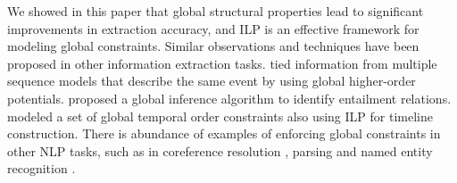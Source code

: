 
 
We showed in this paper that global structural properties lead to significant improvements in extraction accuracy, and ILP is an effective framework for modeling global constraints. Similar observations and techniques have been proposed in other information extraction tasks. 
 tied information from multiple sequence models that describe the same event by using global higher-order potentials. 
 proposed a global inference algorithm to identify entailment relations. 
 modeled a set of global temporal order constraints also using ILP for timeline construction. 
There is abundance of examples of enforcing global constraints in other NLP tasks, such as in coreference resolution \cite{Finkel08}, parsing \cite{Rush12} and named entity recognition \cite{Wang13}.
